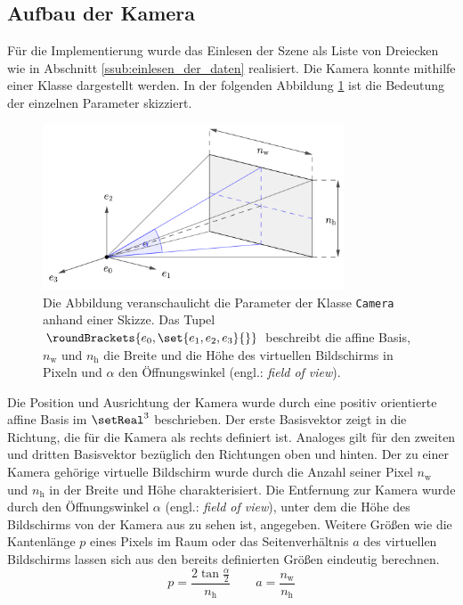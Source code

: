 \documentclass[crop=false]{standalone}
\begin{document}
    \subsection{Aufbau der Kamera} %
    \label{sub:aufbau_der_kamera}
      Für die Implementierung wurde das Einlesen der Szene als Liste von Dreiecken wie in Abschnitt \ref{ssub:einlesen_der_daten} realisiert.
      Die Kamera konnte mithilfe einer Klasse dargestellt werden.
      In der folgenden Abbildung \ref{fig:camera-scheme} ist die Bedeutung der einzelnen Parameter skizziert.
      \begin{figure}
        \center
        \includegraphics[width=0.8\textwidth]{images/camera_scheme.pdf}
        \caption{%
          Die Abbildung veranschaulicht die Parameter der Klasse \texttt{Camera} anhand einer Skizze.
          Das Tupel $\roundBrackets{e_0,\set{e_1,e_2,e_3}{}}$ beschreibt die affine Basis, $n_\mathrm{w}$ und $n_\mathrm{h}$ die Breite und die Höhe des virtuellen Bildschirms in Pixeln und $α$ den Öffnungswinkel (engl.: \textit{field of view}).
        }
        \label{fig:camera-scheme}
      \end{figure}
      Die Position und Ausrichtung der Kamera wurde durch eine positiv orientierte affine Basis im $\setReal^3$ beschrieben.
      Der erste Basisvektor zeigt in die Richtung, die für die Kamera als rechts definiert ist.
      Analoges gilt für den zweiten und dritten Basisvektor bezüglich den Richtungen oben und hinten.
      Der zu einer Kamera gehörige virtuelle Bildschirm wurde durch die Anzahl seiner Pixel $n_\mathrm{w}$ und $n_\mathrm{h}$ in der Breite und Höhe charakterisiert.
      Die Entfernung zur Kamera wurde durch den Öffnungswinkel $\alpha$ (engl.: \textit{field of view}), unter dem die Höhe des Bildschirms von der Kamera aus zu sehen ist, angegeben.
      Weitere Größen wie die Kantenlänge $p$ eines Pixels im Raum oder das Seitenverhältnis $a$ des virtuellen Bildschirms lassen sich aus den bereits definierten Größen eindeutig berechnen.
      \[
        p = \frac{2\tan \frac{\alpha}{2}}{n_\mathrm{h}}
        \qquad
        a = \frac{n_\mathrm{w}}{n_\mathrm{h}}
      \]
\end{document}
